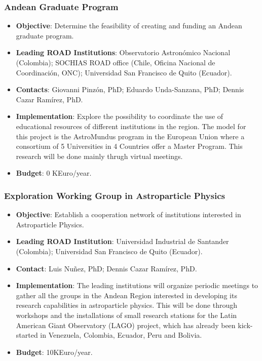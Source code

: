 \documentclass[12pt]{article}
\begin{document}
\subsubsection{Andean Graduate Program}
\begin{itemize}
\item{\bf Objective}: Determine the feasibility of creating and
  funding an Andean graduate program. 
\item{\bf Leading ROAD Institutions}: Observatorio Astron\'omico
  Nacional (Colombia); SOCHIAS ROAD office  (Chile, Oficina
  Nacional de Coordinaci\'on, ONC);  Universidad San
  Francisco de Quito (Ecuador).
\item{\bf Contacts}: Giovanni Pinz\'on, PhD; Eduardo Unda-Sanzana,
  PhD; Dennis Cazar Ram\'irez, PhD. 
\item{\bf Implementation}:
  Explore the possibility to coordinate the use of
  educational resources of different institutions in the region. The
  model for this project is the AstroMundus program in the European
  Union where a consortium of 5 Universities in 4 Countries offer a
  Master Program.  This research will be done mainly thrugh virtual
  meetings.  
\item{\bf Budget}: 0 KEuro/year.
\end{itemize}

\subsubsection{Exploration Working Group in Astroparticle Physics}
\begin{itemize}
\item{\bf Objective}: Establish a cooperation network of institutions
  interested in Astroparticle Physics.
\item{\bf Leading ROAD Institution}: Universidad
  Industrial de Santander (Colombia); Universidad San
  Francisco de Quito (Ecuador). 
\item{\bf Contact}: Luis Nu\~nez, PhD; Dennis Cazar Ram\'irez, PhD. 
\item{\bf Implementation}: The leading institutions will organize
  periodic meetings to gather all the groups in the Andean Region
  interested in developing its research capabilities in astroparticle
  physics. This will be done through workshops and the installations
  of small research stations for the Latin American Giant Observatory
  (LAGO) project, which has already been kick-started 
  in Venezuela, Colombia, Ecuador, Peru and Bolivia.
\item{\bf Budget}: 10KEuro/year.
\end{itemize}
\end{document}
